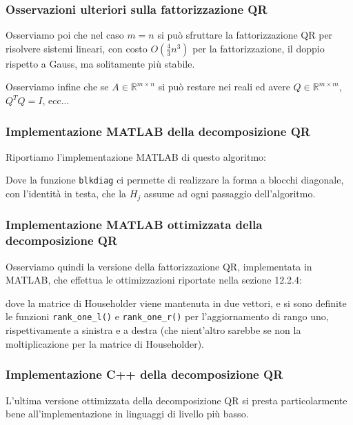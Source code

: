 \documentclass[a4paper,11pt]{article}
\begin{document}
\subsubsection{Osservazioni ulteriori sulla fattorizzazione QR}
Osserviamo poi che nel caso $m = n$ si può sfruttare la fattorizzazione QR per risolvere sistemi lineari, con costo $O(\frac{4}{3}n^3)$ per la fattorizzazione, il doppio rispetto a Gauss, ma solitamente più stabile.

Osserviamo infine che se $A \in \mathbb{R}^{m \times n}$ si può restare nei reali ed avere $Q \in \mathbb{R}^{m \times m}$, $Q^T Q = I$, ecc...

\subsubsection{Implementazione MATLAB della decomposizione QR}
Riportiamo l'implementazione MATLAB di questo algoritmo:

Dove la funzione \lstinline|blkdiag| ci permette di realizzare la forma a blocchi diagonale, con l'identità in testa, che la $H_j$ assume ad ogni passaggio dell'algoritmo.

\subsubsection{Implementazione MATLAB ottimizzata della decomposizione QR}
Osserviamo quindi la versione della fattorizzazione QR, implementata in MATLAB, che effettua le ottimizzazioni riportate nella sezione 12.2.4:

dove la matrice di Householder viene mantenuta in due vettori, e si sono definite le funzioni \lstinline|rank_one_l()| e \lstinline|rank_one_r()| per l'aggiornamento di rango uno, rispettivamente a sinistra e a destra (che nient'altro sarebbe se non la moltiplicazione per la matrice di Householder).

\subsubsection{Implementazione C++ della decomposizione QR}
L'ultima versione ottimizzata della decomposizione QR si presta particolarmente bene all'implementazione in linguaggi di livello più basso. 
\end{document}
